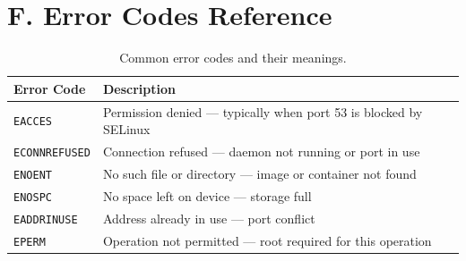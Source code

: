 \section{F. Error Codes Reference}
\label{sec:error-codes}

\begin{table}[htbp]
  \centering
  \caption{Common error codes and their meanings.}
  \label{tab:error-codes}
  \begin{tabularx}{\textwidth}{l X}
    \toprule
    \textbf{Error Code} & \textbf{Description} \\
    \midrule
    \texttt{EACCES}      & Permission denied --- typically when port 53 is blocked by SELinux \\
    \texttt{ECONNREFUSED} & Connection refused --- daemon not running or port in use \\
    \texttt{ENOENT}      & No such file or directory --- image or container not found \\
    \texttt{ENOSPC}      & No space left on device --- storage full \\
    \texttt{EADDRINUSE}  & Address already in use --- port conflict \\
    \texttt{EPERM}       & Operation not permitted --- root required for this operation \\
    \bottomrule
  \end{tabularx}
\end{table}
